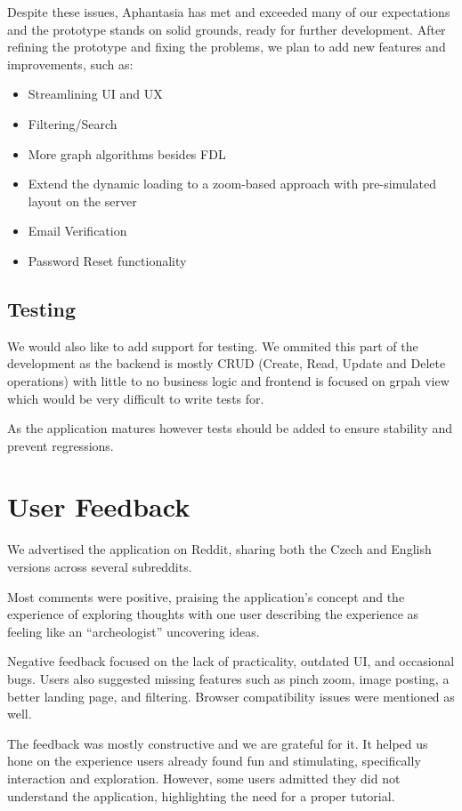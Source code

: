Despite these issues, Aphantasia has met and exceeded many of our expectations and the prototype stands on solid grounds, ready for further development.
After refining the prototype and fixing the problems, we plan to add new features and improvements, such as:
\begin{itemize}
\item Streamlining UI and UX
\item Filtering/Search
\item More graph algorithms besides \gls{FDL}
\item Extend the dynamic loading to a zoom-based approach with pre-simulated layout on the server
\item Email Verification
\item Password Reset functionality
\end{itemize}

\subsection*{Testing}

We would also like to add support for testing.
We ommited this part of the development as the backend is mostly CRUD (Create, Read, Update and Delete operations)
with little to no business logic
and frontend is focused on grpah view which would be very difficult to write tests for.

As the application matures however tests should be added to ensure stability and prevent regressions.

\section{User Feedback}
We advertised the application on Reddit, sharing both the Czech and English versions across several subreddits.

Most comments were positive, praising the application’s concept and the experience of exploring thoughts
with one user describing the experience as feeling like an “archeologist” uncovering ideas. 

Negative feedback focused on the lack of practicality, outdated UI, and occasional bugs.
Users also suggested missing features such as pinch zoom, image posting, a better landing page, and filtering.
Browser compatibility issues were mentioned as well.

The feedback was mostly constructive and we are grateful for it.
It helped us hone on the experience users already found fun and stimulating, specifically interaction and exploration.
However, some users admitted they did not understand the application, highlighting the need for a proper tutorial.

